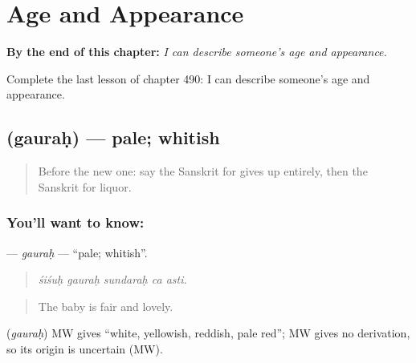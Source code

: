 
\chapter{Age and Appearance}
\label{ch:sa-age-and-appearance}

\begin{chapteropening}
\textbf{By the end of this chapter:} \emph{I can describe someone's age and appearance.}

Complete the last lesson of chapter 490: I can describe someone's age and appearance.
\end{chapteropening}

\section[\texorpdfstring{\sk{गौरः} (gauraḥ)}{गौरः (gauraḥ)}]{ (gauraḥ) — pale; whitish}

\label{lesson:SA-C490-gaurah}



\begin{quote}
Before the new one: say the Sanskrit for gives up entirely, then the Sanskrit for liquor.
\end{quote}

\subsection*{You'll want to know: }
\textbf{} — \emph{gauraḥ} — \textquotedblleft{}pale; whitish\textquotedblright{}.

\begin{quote}
    
\end{quote}

\begin{quote}
\emph{śiśuḥ gauraḥ sundaraḥ ca asti.}
\end{quote}

\begin{quote}
The baby is fair and lovely.
\end{quote}

\begin{cousinweb}
\textbf{} (\emph{gauraḥ}) MW gives \textquotedblleft{}white, yellowish, reddish, pale red\textquotedblright{}; MW gives no derivation, so its origin is uncertain (MW).
\end{cousinweb}

